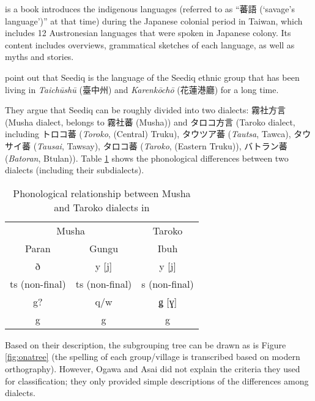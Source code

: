 \textcite{ogawaandasai1935} is a book introduces the indigenous languages (referred to as ``蕃語 (`savage's language')'' at that time) during the Japanese colonial period in Taiwan, which includes 12 Austronesian languages that were spoken in Japanese colony. Its content includes overviews, grammatical sketches of each language, as well as myths and stories.

\textcite{ogawaandasai1935} point out that Seediq is the language of the Seediq ethnic group that has been living in \textit{Taichūshū} (臺中州) and \textit{Karenkōchō} (花蓮港廳) for a long time.

They argue that Seediq can be roughly divided into two dialects: 霧社方言 (Musha dialect, belongs to 霧社蕃 (Musha)) and タロコ方言 (Taroko dialect, including トロコ蕃 (\textit{Toroko}, (Central) Truku), タウツア蕃 (\textit{Tautsa}, Tawca), タウサイ蕃 (\textit{Tausai}, Tawsay), タロコ蕃 (\textit{Taroko}, (Eastern Truku)), バトラン蕃 (\textit{Batoran}, Btulan)). Table \ref{tab:ona1935} shows the phonological differences between two dialects (including their subdialects).

\begin{table}[!htbp]
\centering
\caption{Phonological relationship between Musha and Taroko dialects in \textcite{ogawaandasai1935}}
\label{tab:ona1935}
\begin{tabular}{cc|c}
\hline
\multicolumn{2}{c|}{Musha}                                                               & Taroko       \\
Paran                                                       & Gungu & Ibuh \\ \hline
ð                                                                     & y [j]              & y [j]           \\
ts (non-final) & ts (non-final)    & s (non-final)  \\
g?                                                                   & q/w     & ǥ [ɣ]       \\
g                                                                     & g              & g           \\ \hline
\end{tabular}
\end{table}

Based on their description, the subgrouping tree can be drawn as is Figure \ref{fig:onatree} (the spelling of each group/village is transcribed based on modern orthography). However, Ogawa and Asai did not explain the criteria they used for classification; they only provided simple descriptions of the differences among dialects.

